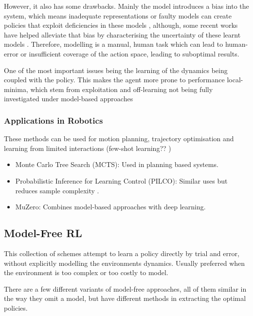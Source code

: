   However, it also has some drawbacks. Mainly the model introduces a bias into the system, which means inadequate representations or faulty models can create policies that exploit deficiencies in these models \cite{Deisenroth2011PILCO,wang2019benchmarkingmodelbasedreinforcementlearning}, although, some recent works have helped alleviate that bias by characterising the uncertainty of these learnt models \cite{kurutach2018modelensembletrustregionpolicyoptimization,chua2018deepreinforcementlearninghandful,clavera2018modelbasedreinforcementlearningmetapolicy}. Therefore, modelling is a manual, human task which can lead to human-error or insufficient coverage of the action space, leading to suboptimal results.

  One of the most important issues being the learning of the dynamics being coupled with the policy. This makes the agent more prone to performance local-minima, which stem from exploitation and off-learning not being fully investigated under model-based approaches 

  \subsubsection{Applications in Robotics}
  These methods can be used for motion planning, trajectory optimisation and learning from limited interactions (few-shot learning?? )
    \begin{itemize}
      \item Monte Carlo Tree Search (MCTS): Used in planning based systems.
      \item Probabilistic Inference for Learning Control (PILCO): Similar uses but reduces sample complexity \cite{Deisenroth2011PILCO}.
      \item MuZero: Combines model-based approaches with deep learning. 
    \end{itemize}
  
  \subsection{Model-Free RL}
  This collection of schemes attempt to learn a policy directly by trial and error, without explicitly modelling the environments dynamics. Usually preferred when the environment is too complex or too costly to model.

  There are a few different variants of model-free approaches, all of them similar in the way they omit a model, but have different methods in extracting the optimal policies.
  


